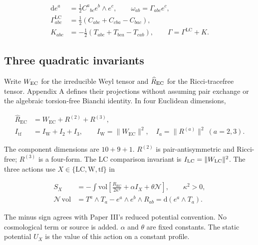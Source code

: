 \begin{equation}\tag{G-04}\label{eq:G-04}
\begin{aligned}
\mathrm{d}e^a&=\frac12 C^a{}_{bc}e^b\wedge e^c,\qquad
\omega_{ab}=\Gamma_{abc}e^c,\\
\Gamma^{\mathrm{LC}}_{abc}&=\frac12(C_{abc}+C_{cba}-C_{bac}),\\
K_{abc}&=-\frac12(T_{abc}+T_{bca}-T_{cab}),\qquad
\Gamma=\Gamma^{\mathrm{LC}}+K.
\end{aligned}
\end{equation}

\subsection{Three quadratic invariants}

Write $W_{\rm EC}$ for the irreducible Weyl tensor and $\widehat R_{\rm EC}$ for the Ricci-tracefree tensor. Appendix A defines their projections without assuming pair exchange or the algebraic torsion-free Bianchi identity. In four Euclidean dimensions,

\begin{equation}\tag{C-01}\label{eq:C-01}
\begin{aligned}
\widehat R_{\mathrm{EC}}&=W_{\mathrm{EC}}+R^{(2)}+R^{(3)},\\
I_{\mathrm{tf}}&=I_{\mathrm W}+I_2+I_3,\qquad
I_{\mathrm W}=\lVert W_{\mathrm{EC}}\rVert^2,\quad
I_a=\lVert R^{(a)}\rVert^2\ (a=2,3).
\end{aligned}
\end{equation}

The component dimensions are $10+9+1$. $R^{(2)}$ is pair-antisymmetric and Ricci-free; $R^{(3)}$ is a four-form. The LC comparison invariant is $I_{\rm LC}=\lVert W_{\rm LC}\rVert^2$. The three actions use $X\in\{\mathrm{LC},\mathrm W,\mathrm{tf}\}$ in

\begin{equation}\tag{C-02}\label{eq:C-02}
\begin{aligned}
S_X&=-\int\mathrm{vol}\left[\frac{R_{\mathrm{EC}}}{2\kappa^2}
+\alpha I_X+\theta\mathcal N\right],\qquad \kappa^2>0,\\
\mathcal N\,\mathrm{vol}&=T^a\wedge T_a-e^a\wedge e^b\wedge R_{ab}
=\mathrm{d}(e^a\wedge T_a).
\end{aligned}
\end{equation}

The minus sign agrees with Paper III's reduced potential convention. No cosmological term or source is added. $\alpha$ and $\theta$ are fixed constants. The static potential $U_X$ is the value of this action on a constant profile.

